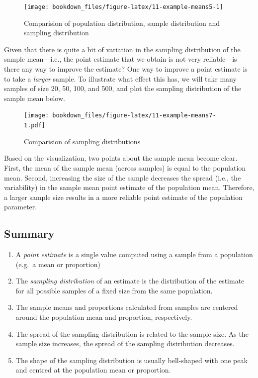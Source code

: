 \documentclass[
]{krantz}
\providecommand{\tightlist}{%
  \setlength{\itemsep}{0pt}\setlength{\parskip}{0pt}}
\begin{document}
\begin{figure}
\texttt{[image: bookdown\_files/figure-latex/11-example-means5-1]} \caption{Comparision of population distribution, sample distribution and sampling distribution}\label{fig:11-example-means5}
\end{figure}

Given that there is quite a bit of variation in the sampling distribution of the sample mean---i.e.,
the point estimate that we obtain is not very reliable---is there any way to improve the estimate?
One way to improve a point estimate is to take a \emph{larger} sample. To illustrate what effect this has,
we will take many samples of size 20, 50, 100, and 500, and plot the sampling distribution of the sample mean
below.

\begin{figure}
\centering
\texttt{[image: bookdown\_files/figure-latex/11-example-means7-1.pdf]}
\caption{\label{fig:11-example-means7}Comparision of sampling distributions}
\end{figure}

Based on the visualization, two points about the sample mean become clear.
First, the
mean of the sample mean (across samples) is equal to the population mean.
Second, increasing the size of the sample
decreases the spread (i.e., the variability) in the sample mean
point estimate of the population mean. Therefore, a larger sample size results
in a more reliable point estimate of the population parameter.

\hypertarget{summary-1}{%
\subsection{Summary}\label{summary-1}}

\begin{enumerate}
\def\labelenumi{\arabic{enumi}.}
\tightlist
\item
  A \emph{point estimate} is a single value computed using a sample from a population (e.g.~a mean or proportion)
\item
  The \emph{sampling distribution} of an estimate is the distribution of the estimate for all possible samples of a fixed size from the same population.
\item
  The sample means and proportions calculated from samples are centered around the population mean and proportion, respectively.
\item
  The spread of the sampling distribution is related to the sample size. As the sample size increases, the spread of the sampling distribution decreases.
\item
  The shape of the sampling distribution is usually bell-shaped with one peak and centred at the population mean or proportion.
\end{enumerate}
\end{document}
